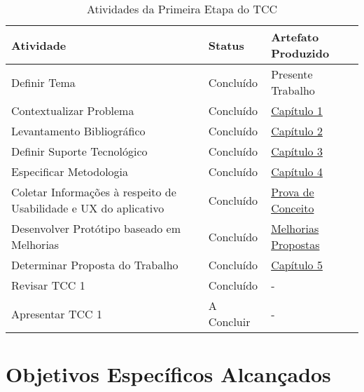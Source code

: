 \begin{table}[h!]
	\centering
	\caption{Atividades da Primeira Etapa do TCC}
	\label{tab09}
	\begin{tabularx}{\textwidth}{p{8cm}|p{2cm}|p{4cm}}
	\hline
    Atividade                                                        & Status       & Artefato Produzido             \\ \hline
    Definir Tema                                                     & Concluído    & Presente Trabalho              \\
    Contextualizar Problema                                          & Concluído    & \hyperref[chap:Introducao]{Capítulo 1}                   \\
    Levantamento Bibliográfico                                       & Concluído    & \hyperref[chap:Referencial]{Capítulo 2}                     \\
    Definir Suporte Tecnológico                                      & Concluído    & \hyperref[chap:ReferencialTech]{Capítulo 3}                   \\
    Especificar Metodologia                                          & Concluído    & \hyperref[chap:Metodologia]{Capítulo 4}                     \\
    Coletar Informações à respeito de Usabilidade e UX do aplicativo & Concluído    & \hyperref[sec:Prova de Conceito]{Prova de Conceito} \\
    Desenvolver Protótipo baseado em Melhorias                       & Concluído    & \hyperref[sec:Melhorias Propostas]{Melhorias Propostas}         \\
    Determinar Proposta do Trabalho                                  & Concluído    & \hyperref[chap:Proposta]{Capítulo 5}                     \\
    Revisar TCC 1                                                    & Concluído    & -                              \\ 
    Apresentar TCC 1                                                 & A Concluir   & -                              \\ \hline
	\end{tabularx}
\end{table}

\section{Objetivos Específicos Alcançados}
\label{sec:Objetivos Especificos Alcancados}

